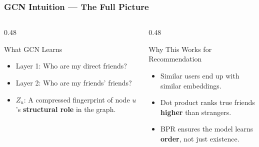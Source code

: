 \documentclass[10pt,aspectratio=43]{beamer}
\begin{document}
\begin{frame}
\frametitle{GCN Intuition --- The Full Picture}

\begin{center}
\end{center}

\vspace{0.3em}

\begin{columns}[T]
\begin{column}{0.48\textwidth}
\begin{block}{What GCN Learns}
\small
\begin{itemize}
  \item \alert{Layer 1:} Who are my direct friends?
  \item \alert{Layer 2:} Who are my friends' friends?
  \item \alert{$Z_u$:} A compressed fingerprint of node $u$'s \textbf{structural role} in the graph.
\end{itemize}
\end{block}
\end{column}
\begin{column}{0.48\textwidth}
\begin{alertblock}{Why This Works for Recommendation}
\small
\begin{itemize}
  \item Similar users end up with \alert{similar embeddings}.
  \item Dot product ranks true friends \textbf{higher} than strangers.
  \item BPR ensures the model learns \textbf{order}, not just existence.
\end{itemize}
\end{alertblock}
\end{column}
\end{columns}


\end{frame}
\end{document}
